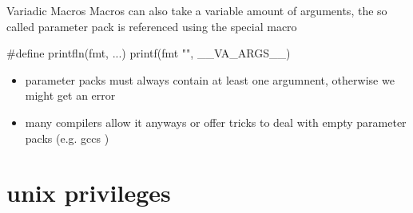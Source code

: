 \documentclass[10pt,graphics,aspectratio=169,table]{beamer}
\begin{document}
\begin{frame}[fragile]{Variadic Macros}
    Macros can also take a variable amount of arguments, the so called
    parameter pack is referenced using the special macro 

    \begin{codeblock}
#define printfln(fmt, ...) printf(fmt "\n", __VA_ARGS__)
    \end{codeblock}
    \begin{itemize}
        \item parameter packs must always contain at least one argumnent,
        otherwise we might get an error
        \item many compilers allow it anyways or offer tricks to deal with 
            empty parameter packs (e.g. gccs )
    \end{itemize}
\end{frame}

\section{unix privileges}
\end{document}
